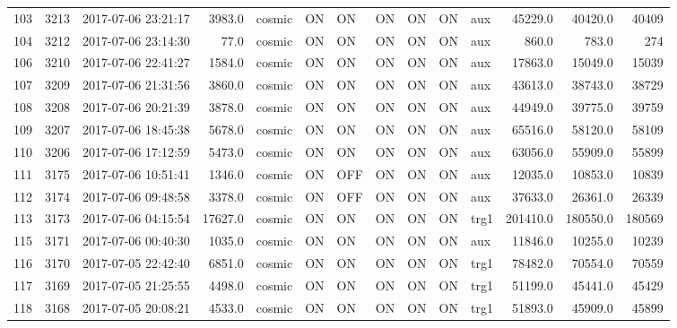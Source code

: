 \begin{longtable}{lrlrlllllllrrr}
103 &  3213 &  2017-07-06 23:21:17 &    3983.0 &   cosmic &  ON &   ON &   ON &  ON &   ON &       aux &     45229.0 &      40420.0 &               40409 \\
104 &  3212 &  2017-07-06 23:14:30 &      77.0 &   cosmic &  ON &   ON &   ON &  ON &   ON &       aux &       860.0 &        783.0 &                 274 \\
106 &  3210 &  2017-07-06 22:41:27 &    1584.0 &   cosmic &  ON &   ON &   ON &  ON &   ON &       aux &     17863.0 &      15049.0 &               15039 \\
107 &  3209 &  2017-07-06 21:31:56 &    3860.0 &   cosmic &  ON &   ON &   ON &  ON &   ON &       aux &     43613.0 &      38743.0 &               38729 \\
108 &  3208 &  2017-07-06 20:21:39 &    3878.0 &   cosmic &  ON &   ON &   ON &  ON &   ON &       aux &     44949.0 &      39775.0 &               39759 \\
109 &  3207 &  2017-07-06 18:45:38 &    5678.0 &   cosmic &  ON &   ON &   ON &  ON &   ON &       aux &     65516.0 &      58120.0 &               58109 \\
110 &  3206 &  2017-07-06 17:12:59 &    5473.0 &   cosmic &  ON &   ON &   ON &  ON &   ON &       aux &     63056.0 &      55909.0 &               55899 \\
111 &  3175 &  2017-07-06 10:51:41 &    1346.0 &   cosmic &  ON &  OFF &   ON &  ON &   ON &       aux &     12035.0 &      10853.0 &               10839 \\
112 &  3174 &  2017-07-06 09:48:58 &    3378.0 &   cosmic &  ON &  OFF &   ON &  ON &   ON &       aux &     37633.0 &      26361.0 &               26339 \\
113 &  3173 &  2017-07-06 04:15:54 &   17627.0 &   cosmic &  ON &   ON &   ON &  ON &   ON &      trg1 &    201410.0 &     180550.0 &              180569 \\
115 &  3171 &  2017-07-06 00:40:30 &    1035.0 &   cosmic &  ON &   ON &   ON &  ON &   ON &       aux &     11846.0 &      10255.0 &               10239 \\
116 &  3170 &  2017-07-05 22:42:40 &    6851.0 &   cosmic &  ON &   ON &   ON &  ON &   ON &      trg1 &     78482.0 &      70554.0 &               70559 \\
117 &  3169 &  2017-07-05 21:25:55 &    4498.0 &   cosmic &  ON &   ON &   ON &  ON &   ON &      trg1 &     51199.0 &      45441.0 &               45429 \\
118 &  3168 &  2017-07-05 20:08:21 &    4533.0 &   cosmic &  ON &   ON &   ON &  ON &   ON &      trg1 &     51893.0 &      45909.0 &               45899 \\

\end{longtable}
